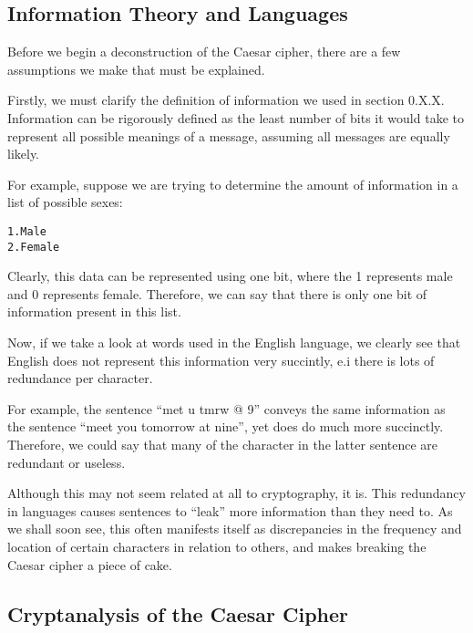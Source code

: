 \documentclass[12pt, a4paper, draft]{report}
\begin{document}

\subsection{Information Theory and Languages}

Before we begin a deconstruction of the Caesar cipher, there are a few
assumptions we make that must be explained.

Firstly, we must clarify the definition of information we used in section
0.X.X. Information can be rigorously defined as the least number of bits
it would take to represent all possible meanings of a message, assuming
all messages are equally likely.

For example, suppose we are trying to determine the amount of information
in a list of possible sexes:

\begin{center}
\begin{alltt}
1. Male
2. Female
\end{alltt}
\end{center}

Clearly, this data can be represented using one bit, where the 1
represents male and 0 represents female. Therefore, we can say that there
is only one bit of information present in this list.

Now, if we take a look at words used in the English language, we clearly
see that English does not represent this information very succintly, e.i
there is lots of redundance per character.

For example, the sentence ``met u tmrw @ 9'' conveys the same information
as the sentence ``meet you tomorrow at nine'', yet does do much more
succinctly. Therefore, we could say that many of the character in the
latter sentence are redundant or useless.

Although this may not seem related at all to cryptography, it is. This
redundancy in languages causes sentences to ``leak'' more information than
they need to. As we shall soon see, this often manifests itself as
discrepancies in the frequency and location of certain characters in
relation to others, and makes breaking the Caesar cipher a piece of
cake.


\subsection{Cryptanalysis of the Caesar Cipher}
\end{document}
